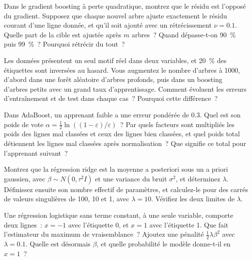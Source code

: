 \begin{question}\label{iq:iv1:machine-learning:15}
Dans le gradient boosting à perte quadratique, montrez que le résidu est l'opposé du gradient. Supposez que chaque nouvel arbre ajuste exactement le résidu courant d'une ligne donnée, et qu'il soit ajouté avec un rétrécissement $\nu = 0.1$. Quelle part de la cible est ajustée après $m$ arbres~? Quand dépasse-t-on 90~\% puis 99~\%~? Pourquoi rétrécir du tout~?
\end{question}

\begin{question}\label{iq:iv1:machine-learning:16}
Les données présentent un seul motif réel dans deux variables, et 20~\% des étiquettes sont inversées au hasard. Vous augmentez le nombre d'arbres à 1000, d'abord dans une forêt aléatoire d'arbres profonds, puis dans un boosting d'arbres petits avec un grand taux d'apprentissage. Comment évoluent les erreurs d'entraînement et de test dans chaque cas~? Pourquoi cette différence~?
\end{question}

\begin{question}\label{iq:iv1:machine-learning:17}
Dans AdaBoost, un apprenant faible a une erreur pondérée de $0.3$. Quel est son poids de vote $\alpha = \frac12\ln((1 - \varepsilon)/\varepsilon)$~? Par quels facteurs sont multipliés les poids des lignes mal classées et ceux des lignes bien classées, et quel poids total détiennent les lignes mal classées après normalisation~? Que signifie ce total pour l'apprenant suivant~?
\end{question}

\begin{question}\label{iq:iv1:machine-learning:18}
Montrez que la régression ridge est la moyenne a posteriori sous un a priori gaussien, avec $\beta \sim N(0, \tau^2 I)$ et une variance du bruit $\sigma^2$, et déterminez $\lambda$. Définissez ensuite son nombre effectif de paramètres, et calculez-le pour des carrés de valeurs singulières de 100, 10 et 1, avec $\lambda = 10$. Vérifiez les deux limites de $\lambda$.
\end{question}

\begin{question}\label{iq:iv1:machine-learning:19}
Une régression logistique sans terme constant, à une seule variable, comporte deux lignes~: $x = -1$ avec l'étiquette 0, et $x = 1$ avec l'étiquette 1. Que fait l'estimateur du maximum de vraisemblance~? Ajoutez une pénalité $\frac12\lambda\beta^2$ avec $\lambda = 0.1$. Quelle est désormais $\beta$, et quelle probabilité le modèle donne-t-il en $x = 1$~?
\end{question}

